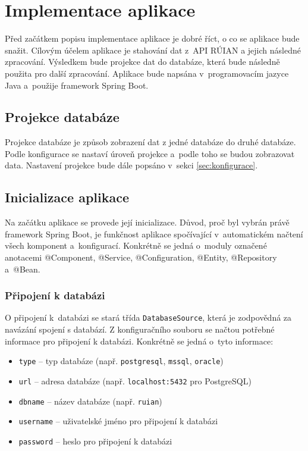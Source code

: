 \chapter{Implementace aplikace}
Před začátkem popisu implementace aplikace je dobré říct, o co se aplikace bude snažit.
Cílovým účelem aplikace je stahování dat z~API RÚIAN a jejich následné zpracování.
Výsledkem bude projekce dat do databáze, která bude následně použita pro další zpracování.
Aplikace bude napsána v~programovacím jazyce Java a~použije framework Spring Boot.

\section{Projekce databáze}
Projekce databáze je způsob zobrazení dat z jedné databáze do druhé databáze.
Podle konfigurace se nastaví úroveň projekce a~podle toho se budou zobrazovat data.
Nastavení projekce bude dále popsáno v~sekci \ref{sec:konfigurace}.

\section{Inicializace aplikace}
Na začátku aplikace se provede její inicializace.
Důvod, proč byl vybrán právě framework Spring Boot, je funkčnost aplikace spočívající v~automatickém načtení všech komponent a~konfigurací.
Konkrétně se jedná o~moduly označené anotacemi @Component, @Service, @Configuration, @Entity, @Repository a~@Bean.

\newpage

\subsection{Připojení k databázi}
O připojení k~databázi se stará třída \texttt{DatabaseSource}, která je zodpovědná za navázání spojení s databází.
Z konfiguračního souboru se načtou potřebné informace pro připojení k databázi.
Konkrétně se jedná o~tyto informace:
\begin{itemize}
    \item \texttt{type} -- typ databáze (např. \texttt{postgresql}, \texttt{mssql}, \texttt{oracle})
    \item \texttt{url} -- adresa databáze (např. \texttt{localhost:5432} pro PostgreSQL)
    \item \texttt{dbname} -- název databáze (např. \texttt{ruian})
    \item \texttt{username} -- uživatelské jméno pro připojení k databázi
    \item \texttt{password} -- heslo pro připojení k databázi
\end{itemize}

